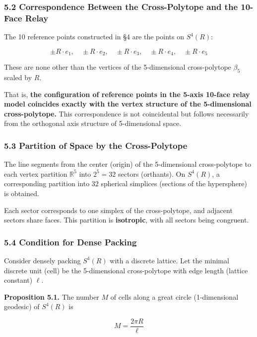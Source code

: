 \documentclass[a4paper,11pt]{article}
\newcounter{none}
\begin{document}
\subsubsection{5.2 Correspondence Between the Cross-Polytope and the
10-Face
Relay}\label{correspondence-between-the-cross-polytope-and-the-10-face-relay}

The 10 reference points constructed in §4 are the points on \(S^4(R)\):

\[\pm R \cdot e_1, \quad \pm R \cdot e_2, \quad \pm R \cdot e_3, \quad \pm R \cdot e_4, \quad \pm R \cdot e_5\]

These are none other than the vertices of the 5-dimensional
cross-polytope \(\beta_5\) scaled by \(R\).

That is, \textbf{the configuration of reference points in the 5-axis
10-face relay model coincides exactly with the vertex structure of the
5-dimensional cross-polytope.} This correspondence is not coincidental
but follows necessarily from the orthogonal axis structure of
5-dimensional space.

\subsubsection{5.3 Partition of Space by the
Cross-Polytope}\label{partition-of-space-by-the-cross-polytope}

The line segments from the center (origin) of the 5-dimensional
cross-polytope to each vertex partition \(\mathbb{R}^5\) into
\(2^5 = 32\) sectors (orthants). On \(S^4(R)\), a corresponding
partition into \(32\) spherical simplices (sections of the hypersphere)
is obtained.

Each sector corresponds to one simplex of the cross-polytope, and
adjacent sectors share faces. This partition is \textbf{isotropic}, with
all sectors being congruent.

\subsubsection{5.4 Condition for Dense
Packing}\label{condition-for-dense-packing}

Consider densely packing \(S^4(R)\) with a discrete lattice. Let the
minimal discrete unit (cell) be the 5-dimensional cross-polytope with
edge length (lattice constant) \(\ell\).

\textbf{Proposition 5.1.} The number \(M\) of cells along a great circle
(1-dimensional geodesic) of \(S^4(R)\) is

\[M = \frac{2\pi R}{\ell}\]
\end{document}
